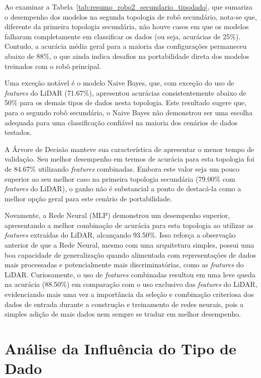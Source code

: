 Ao examinar a Tabela~\ref{tab:resumo_robo2_secundario_tipodado}, que sumariza o desempenho dos modelos na segunda topologia de robô secundário, nota-se que, diferente da primeira topologia secundária, não houve casos em que os modelos falharam completamente em classificar os dados (ou seja, acurácias de 25\%). Contudo, a acurácia média geral para a maioria das configurações permaneceu abaixo de 88\%, o que ainda indica desafios na portabilidade direta dos modelos treinados com o robô principal.

Uma exceção notável é o modelo Naive Bayes, que, com exceção do uso de \textit{features} do LiDAR (71.67\%), apresentou acurácias consistentemente abaixo de 50\% para os demais tipos de dados nesta topologia. Este resultado sugere que, para o segundo robô secundário, o Naive Bayes não demonstrou ser uma escolha adequada para uma classificação confiável na maioria dos cenários de dados testados.

A Árvore de Decisão manteve sua característica de apresentar o menor tempo de validação. Seu melhor desempenho em termos de acurácia para esta topologia foi de 84.67\% utilizando \textit{features} combinadas. Embora este valor seja um pouco superior ao seu melhor caso na primeira topologia secundária (79.00\% com \textit{features} do LiDAR), o ganho não é substancial a ponto de destacá-la como a melhor opção geral para este cenário de portabilidade.

Novamente, a Rede Neural (MLP) demonstrou um desempenho superior, apresentando a melhor combinação de acurácia para esta topologia ao utilizar as \textit{features} extraídas do LiDAR, alcançando 93.50\%. Isso reforça a observação anterior de que a Rede Neural, mesmo com uma arquitetura simples, possui uma boa capacidade de generalização quando alimentada com representações de dados mais processadas e potencialmente mais discriminatórias, como as \textit{features} do LiDAR. Curiosamente, o uso de \textit{features} combinadas resultou em uma leve queda na acurácia (88.50\%) em comparação com o uso exclusivo das \textit{features} do LiDAR, evidenciando mais uma vez a importância da seleção e combinação criteriosa dos dados de entrada durante a construção e treinamento de redes neurais, pois a simples adição de mais dados nem sempre se traduz em melhor desempenho.

\section{Análise da Influência do Tipo de Dado}

